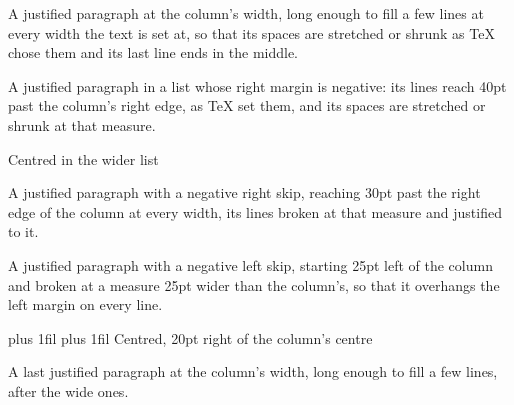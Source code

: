 \documentclass{article}
\begin{document}
A justified paragraph at the column's width, long enough to fill a few lines at every width the text is set
at, so that its spaces are stretched or shrunk as TeX chose them and its last line ends in the middle.
\begin{list}{}{\leftmargin 0pt \rightmargin -40pt \listparindent\parindent}
\item[] A justified paragraph in a list whose right margin is negative: its lines reach 40pt past the
column's right edge, as TeX set them, and its spaces are stretched or shrunk at that measure.

\centering Centred in the wider list
\end{list}
{\rightskip -30pt A justified paragraph with a negative right skip, reaching 30pt past the right edge of the
column at every width, its lines broken at that measure and justified to it.\par}
{\leftskip -25pt A justified paragraph with a negative left skip, starting 25pt left of the column and broken
at a measure 25pt wider than the column's, so that it overhangs the left margin on every line.\par}
{\leftskip 0pt plus 1fil \rightskip -40pt plus 1fil \parfillskip 0pt Centred, 20pt right of the column's centre\par}
A last justified paragraph at the column's width, long enough to fill a few lines, after the wide ones.
\end{document}
